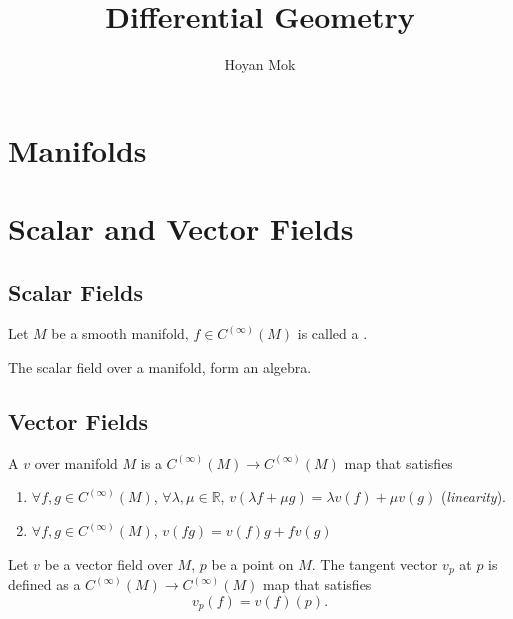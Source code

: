 \documentclass[openany, oneside, a5paper]{book}
\title{Differential Geometry}
\author{Hoyan Mok}
\begin{document}
\maketitle
\frontmatter

\tableofcontents
\mainmatter{}

\chapter{Manifolds}

\chapter{Scalar and Vector Fields}

\section{Scalar Fields}

\begin{definition}
    Let $M$ be a smooth manifold, $f \in C^{(\infty)}(M)$ is called a .
\end{definition}

The scalar field over a manifold, form an algebra.

\section{Vector Fields}

\begin{definition}
    A  $v$ over manifold $M$ is a $C^{(\infty)}(M) \to C^{(\infty)}(M)$ map that satisfies
    \begin{enumerate}[label=(\alph*)]
        \item $\forall f, g \in C^{(\infty)}(M)$, $\forall \lambda, \mu \in \mathbb R$, $v(\lambda f + \mu g) = \lambda v(f) + \mu v(g)$ (\emph{linearity}).
        \item $\forall f, g \in C^{(\infty)}(M)$, $v(fg) = v(f) g + f v(g)$ 
    \end{enumerate}
\end{definition}

\begin{definition}
    Let $v$ be a vector field over $M$, $p$ be a point on $M$.
    The tangent vector $v_p$ at $p$ is defined as a $C^{(\infty)}(M) \to C^{(\infty)}(M)$ map that satisfies
    \begin{equation}
        v_p(f) = v(f)(p).
    \end{equation}
\end{definition}
\end{document}
